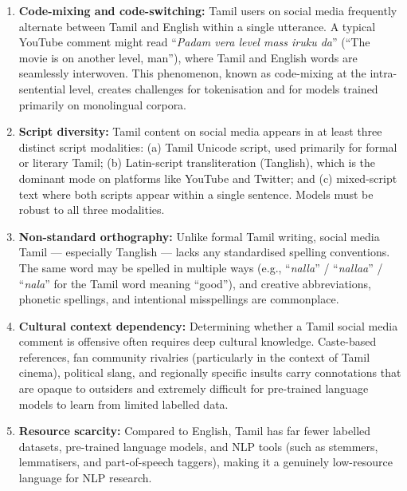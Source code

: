 \documentclass[12pt, a4paper]{article}
\begin{document}
\begin{enumerate}[leftmargin=2em]
    \item \textbf{Code-mixing and code-switching:} Tamil users on social media frequently alternate between Tamil and English within a single utterance. A typical YouTube comment might read ``\textit{Padam vera level mass iruku da}'' (``The movie is on another level, man''), where Tamil and English words are seamlessly interwoven. This phenomenon, known as code-mixing at the intra-sentential level, creates challenges for tokenisation and for models trained primarily on monolingual corpora.
    
    \item \textbf{Script diversity:} Tamil content on social media appears in at least three distinct script modalities: (a) Tamil Unicode script, used primarily for formal or literary Tamil; (b) Latin-script transliteration (Tanglish), which is the dominant mode on platforms like YouTube and Twitter; and (c) mixed-script text where both scripts appear within a single sentence. Models must be robust to all three modalities.
    
    \item \textbf{Non-standard orthography:} Unlike formal Tamil writing, social media Tamil --- especially Tanglish --- lacks any standardised spelling conventions. The same word may be spelled in multiple ways (e.g., ``\textit{nalla}'' / ``\textit{nallaa}'' / ``\textit{nala}'' for the Tamil word meaning ``good''), and creative abbreviations, phonetic spellings, and intentional misspellings are commonplace.
    
    \item \textbf{Cultural context dependency:} Determining whether a Tamil social media comment is offensive often requires deep cultural knowledge. Caste-based references, fan community rivalries (particularly in the context of Tamil cinema), political slang, and regionally specific insults carry connotations that are opaque to outsiders and extremely difficult for pre-trained language models to learn from limited labelled data.
    
    \item \textbf{Resource scarcity:} Compared to English, Tamil has far fewer labelled datasets, pre-trained language models, and NLP tools (such as stemmers, lemmatisers, and part-of-speech taggers), making it a genuinely low-resource language for NLP research.
\end{enumerate}
\end{document}
